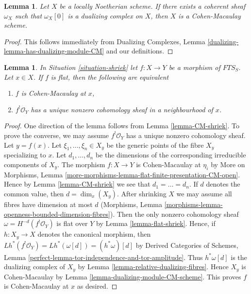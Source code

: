 \documentclass{stacks-project}
\theoremstyle{plain}
\newtheorem{lemma}[subsection]{Lemma}
\theoremstyle{definition}
\theoremstyle{remark}
\numberwithin{equation}{subsection}
\begin{document}
\begin{lemma}
\label{lemma-has-dualizing-module-CM-scheme}
Let $X$ be a locally Noetherian scheme. If there exists a coherent sheaf
$\omega_X$ such that $\omega_X[0]$ is a dualizing complex on $X$, then
$X$ is a Cohen-Macaulay scheme.
\end{lemma}

\begin{proof}
This follows immediately from
Dualizing Complexes, Lemma \ref{dualizing-lemma-has-dualizing-module-CM}
and our definitions.
\end{proof}

\begin{lemma}
\label{lemma-affine-flat-Noetherian-CM}
In Situation \ref{situation-shriek} let $f : X \to Y$ be a morphism
of $\textit{FTS}_S$. Let $x \in X$. If $f$ is flat, then
the following are equivalent
\begin{enumerate}
\item $f$ is Cohen-Macaulay at $x$,
\item $f^!\mathcal{O}_Y$ has a unique nonzero cohomology sheaf
in a neighbourhood of $x$.
\end{enumerate}
\end{lemma}

\begin{proof}
One direction of the lemma follows from Lemma \ref{lemma-CM-shriek}.
To prove the converse, we may assume $f^!\mathcal{O}_Y$ has a unique
nonzero cohomology sheaf. Let $y = f(x)$. Let $\xi_1, \ldots, \xi_n \in X_y$
be the generic points of the fibre $X_y$ specializing to $x$.
Let $d_1, \ldots, d_n$ be the dimensions of the corresponding
irreducible components of $X_y$. The morphism $f : X \to Y$ is Cohen-Macaulay
at $\eta_i$ by More on Morphisms, Lemma
\ref{more-morphisms-lemma-flat-finite-presentation-CM-open}.
Hence by Lemma \ref{lemma-CM-shriek} we see that
$d_1 = \ldots = d_n$. If $d$ denotes the common value, then $d = \dim_x(X_y)$.
After shrinking $X$ we may assume all fibres have dimension at most $d$
(Morphisms, Lemma \ref{morphisms-lemma-openness-bounded-dimension-fibres}).
Then the only nonzero cohomology sheaf $\omega = H^{-d}(f^!\mathcal{O}_Y)$
is flat over $Y$ by Lemma \ref{lemma-flat-shriek}.
Hence, if $h : X_y \to X$ denotes the canonical morphism, then
$Lh^*(f^!\mathcal{O}_Y) = Lh^*(\omega[d]) = (h^*\omega)[d]$
by Derived Categories of Schemes, Lemma
\ref{perfect-lemma-tor-independence-and-tor-amplitude}.
Thus $h^*\omega[d]$ is the dualizing complex of $X_y$ by
Lemma \ref{lemma-relative-dualizing-fibres}.
Hence $X_y$ is Cohen-Macaulay by
Lemma \ref{lemma-dualizing-module-CM-scheme}.
This proves $f$ is Cohen-Macaulay at $x$ as desired.
\end{proof}
\end{document}
